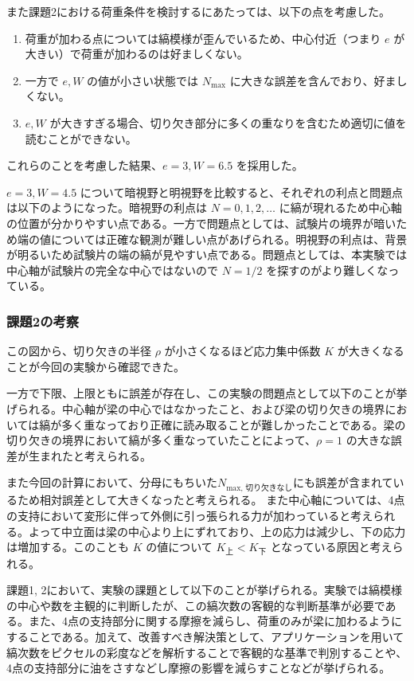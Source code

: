 \documentclass[uplatex,dvipdfmx,titlepage]{jsarticle}
\begin{document}
また課題2における荷重条件を検討するにあたっては、以下の点を考慮した。
\begin{enumerate}[label=\arabic*.]
    \item 荷重が加わる点については縞模様が歪んでいるため、中心付近（つまり $e$ が大きい）で荷重が加わるのは好ましくない。
    \item 一方で $e, W$ の値が小さい状態では $N_{\text{max}}$ に大きな誤差を含んでおり、好ましくない。
    \item $e, W$ が大きすぎる場合、切り欠き部分に多くの重なりを含むため適切に値を読むことができない。
\end{enumerate}
これらのことを考慮した結果、$e=3, W=6.5$ を採用した。

$e=3, W=4.5$ について暗視野と明視野を比較すると、それぞれの利点と問題点は以下のようになった。暗視野の利点は $N=0, 1, 2, \dots$ に縞が現れるため中心軸の位置が分かりやすい点である。一方で問題点としては、試験片の境界が暗いため端の値については正確な観測が難しい点があげられる。明視野の利点は、背景が明るいため試験片の端の縞が見やすい点である。問題点としては、本実験では中心軸が試験片の完全な中心ではないので $N=1/2$ を探すのがより難しくなっている。

\subsubsection*{課題2の考察}
この図から、切り欠きの半径 $\rho$ が小さくなるほど応力集中係数 $K$ が大きくなることが今回の実験から確認できた。

一方で下限、上限ともに誤差が存在し、この実験の問題点として以下のことが挙げられる。中心軸が梁の中心ではなかったこと、および梁の切り欠きの境界においては縞が多く重なっており正確に読み取ることが難しかったことである。梁の切り欠きの境界において縞が多く重なっていたことによって、$\rho=1$ の大きな誤差が生まれたと考えられる。

また今回の計算において、分母にもちいた$N_{\text{max, 切り欠きなし}}$にも誤差が含まれているため相対誤差として大きくなったと考えられる。
また中心軸については、4点の支持において変形に伴って外側に引っ張られる力が加わっていると考えられる。よって中立面は梁の中心より上にずれており、上の応力は減少し、下の応力は増加する。このことも $K$ の値について $K_{\text{上}} < K_{\text{下}}$ となっている原因と考えられる。

課題1, 2において、実験の課題として以下のことが挙げられる。実験では縞模様の中心や数を主観的に判断したが、この縞次数の客観的な判断基準が必要である。また、4点の支持部分に関する摩擦を減らし、荷重のみが梁に加わるようにすることである。加えて、改善すべき解決策として、アプリケーションを用いて縞次数をピクセルの彩度などを解析することで客観的な基準で判別することや、4点の支持部分に油をさすなどし摩擦の影響を減らすことなどが挙げられる。
\end{document}
